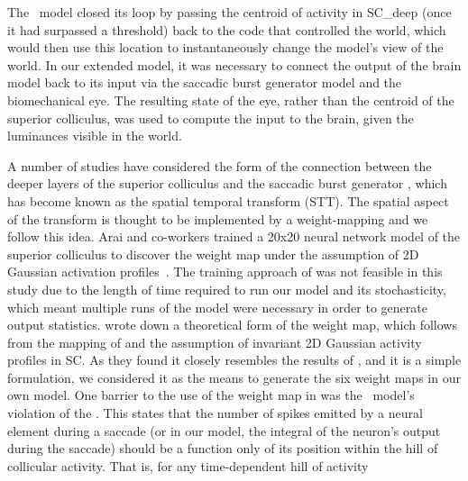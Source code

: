 \documentclass{frontiersSCNS}
\begin{document}
The \ccg~model closed its loop by passing the centroid of activity in
SC\_deep (once it had surpassed a threshold) back to the code that
controlled the world, which would then use this location to
instantaneously change the model's view of the world. In our extended
model, it was necessary to connect the output of the brain model back
to its input via the saccadic burst generator model and the
biomechanical eye. The resulting state of the eye, rather than the
centroid of the superior colliculus, was used to compute the input to
the brain, given the luminances visible in the world.

A number of studies have considered the form of the connection between
the deeper layers of the superior colliculus and the saccadic burst
generator \citep{van_gisbergen_experimental_1985,ottes_visuomotor_1986,waitzman_superior_1991,groh_converting_2001,arai_two-dimensional_1994,goossens_dynamic_2006,tabareau_geometry_2007,van_opstal_linear_2008,goossens_optimal_2012},
which has become known as the spatial temporal transform (STT).  The
spatial aspect of the transform is thought to be implemented by a
weight-mapping \citep{tabareau_geometry_2007,arai_two-dimensional_1994}
and we follow this idea.
%
Arai and co-workers trained a 20x20 neural network model of the
superior colliculus to discover the weight map under the assumption of
2D Gaussian activation profiles~\citep{arai_two-dimensional_1994}.
%
The training approach of \cite{arai_two-dimensional_1994} was not
feasible in this study due to the length of time required to run our
model and its stochasticity, which meant multiple runs of the model
were necessary in order to generate output statistics.
%
\cite{tabareau_geometry_2007} wrote down a theoretical form of the weight
map, which follows from the mapping of \cite{ottes_visuomotor_1986}
and the assumption of invariant 2D Gaussian activity profiles in
SC. As they found it closely resembles the results
of \cite{arai_two-dimensional_1994}, and it is a simple formulation,
we considered it as the means to generate the six weight maps in our
own model.
%
One barrier to the use of the weight map
in \cite{tabareau_geometry_2007} was the \ccg~model's violation of the
. This states that the number of spikes
emitted by a neural element during a saccade (or in our model, the
integral of the neuron's output during the saccade) should be a
function only of its position within the hill of collicular
activity. That is, for any time-dependent hill of activity
\end{document}
